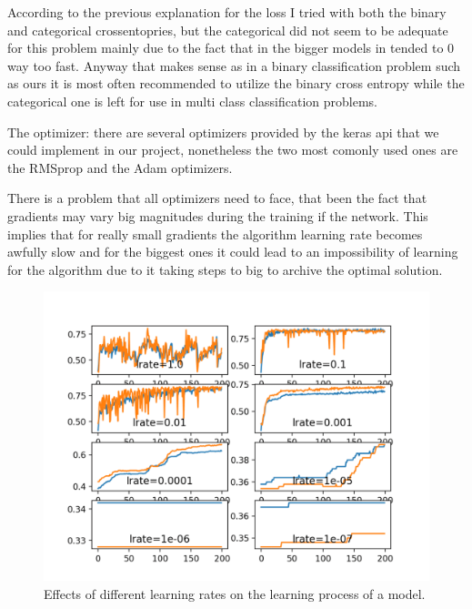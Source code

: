 \documentclass[12pt, a4paper]{article}
\begin{document}
	According to the previous explanation for the loss I tried with both the binary and categorical crossentopries, but the categorical did not seem to be adequate for this problem mainly due to the fact that in the bigger models in tended to 0 way too fast. Anyway that makes sense as in a binary classification problem such as ours it is most often recommended to utilize the binary cross entropy while the categorical one is left for use in multi class classification problems.
	
	The optimizer: there are several optimizers provided by the keras api that we could implement in our project, nonetheless the two most comonly used ones are the RMSprop and the Adam optimizers.
	
	There is a problem that all optimizers need to face, that been the fact that gradients may vary big magnitudes during the training if the network. This implies that for really small gradients the algorithm learning rate becomes awfully slow and for the biggest ones it could lead to an impossibility of learning for the algorithm due to it taking steps to big to archive the optimal solution.
	
	\begin{figure}[H]
		\centering
		\label{learningRates}
		\includegraphics[scale=0.3]{img/learningRates.png}
		\caption{Effects of different learning rates on the learning process of a model. \cite{learningRates}}
	\end{figure}
	
\end{document}
